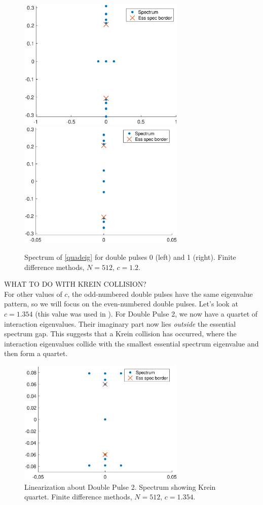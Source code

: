 \documentclass[12pt]{article}
\begin{document}
\begin{figure}[H]
\centering
\label{fig:quadeigdouble}
\includegraphics[width=8cm]{spec12_double1.eps}
\includegraphics[width=8cm]{spec12_double2.eps}
\caption{Spectrum of \eqref{quadeig} for double pulses 0 (left) and 1 (right). Finite difference methods, $N = 512$, $c = 1.2$.}
\end{figure}

WHAT TO DO WITH KREIN COLLISION?\\

For other values of $c$, the odd-numbered double pulses have the same eigenvalue pattern, so we will focus on the even-numbered double pulses. Let's look at $c = 1.354$ (this value was used in \cite{Chen1997}). For Double Pulse 2, we now have a quartet of interaction eigenvalues. Their imaginary part now lies \emph{outside} the essential spectrum gap. This suggests that a Krein collision has occurred, where the interaction eigenvalues collide with the smallest essential spectrum eigenvalue and then form a quartet.

\begin{figure}[H]
\centering
\includegraphics[width=8cm]{spec1354_double2.eps}
\caption{Linearization about Double Pulse 2. Spectrum showing Krein quartet. Finite difference methods, $N = 512$, $c = 1.354$.}
\end{figure}
\end{document}
